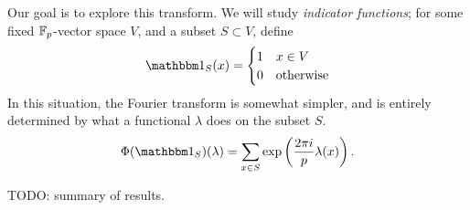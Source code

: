 Our goal is to explore this transform. We will study \emph{indicator functions}; for
some fixed $\mathbb{F}_p$-vector space $V$, and a subset $S\subset V$, define
\[ \IND_S(x) = \begin{cases}
    1 & x \in V \\
    0 & \text{otherwise}     
\end{cases} \]
In this situation, the Fourier transform is somewhat simpler, and is entirely
determined by what a functional $\lambda$ does on the subset $S$.
\[ \Phi(\IND_S)(\lambda) = \sum_{x\in S} \exp \left(\frac{2\pi i}{p} \lambda(x)\right). \]

TODO: summary of results.
